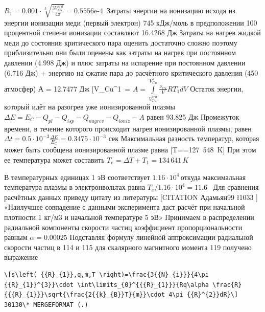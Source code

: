 \documentclass[11pt]{article}
\begin{document}
\({{R}_{1}}=0.001\cdot \sqrt[3]{\frac{3V_{Cu}^{crit}}{4\pi }}=\text{0}\text{.5556e-4}\, \)
Затраты энергии на ионизацию исходя из энергии ионизации меди (первый
электрон) 745 кДж/моль в предположении 100 процентной степени ионизации
составляют 16.4268 Дж Затраты на нагрев жидкой меди до состояния
критического пара оценить достаточно сложно поэтому приблизительно они
были оценены как затраты на нагрев при постоянном давлении (4.998 Дж) и
плюс затраты на испарение при постоянном давлении (6.716 Дж) + энергию
на сжатие пара до расчётного критического давления (450 атмосфер) А =
12.7477 Дж
{[}V\_{Cu}^{1~}=\frac{{{\nu }_{Cu}}R{{T}_{1}}}{{{p}^{1\ }}}{]}
\(A=\int\limits_{V_{Cu}^{crit}}^{V_{Cu}^{1\, }}{\frac{{{\nu }_{Cu}}}{V}R{{T}_{1}}dV}\)
Остаток энергии, который идёт на разогрев уже ионизированной плазмы
\(\Delta E={{E}_{C}}-{{Q}_{pl}}-{{Q}_{isp}}-{{Q}_{nagrev}}-{{Q}_{ioniz}}-A\)
равен 93.825 Дж Промежуток времени, в течение которого происходит нагрев
ионизированной плазмы, равен
\(\Delta t=0.5\cdot {{10}^{-3}}\frac{\Delta E}{{{E}_{C}}}=0.3475\cdot {{10}^{-3}}\)
сек Максимальная разность температур, которая может быть сообщена
ионизированной плазме равна
{[}\Delta T==127~548~K{]}
При этом ее температура может составить
\({{T}_{e}}=\Delta T+{{T}_{1}}=134\, 641\, K\)

В температурных единицах 1 эВ соответствует
\(1.16\cdot {{10}^{4}}\, \)откуда максимальная температура плазмы в
электронвольтах равна \({{{T}_{e}}}/{1.16\cdot {{10}^{4}}=11.6\ }\;\)
Для сравнения расчётных данных приведу цитату из литературы {[}CITATION
Адамьян99 \l 1033 {]} «Наилучшее совпадение с данными эксперимента даст
расчёт при начальной плотности 1 кг/м3 и начальной температуре 5 эВ»
Принимаем в распределении радиальной компоненты скорости частиц
коэффициент пропорциональности равным \(\alpha =0.00025\) Подставляя
формулу линейной аппроксимации радиальной скорости частиц в 114 и 115
для скалярного магнитного момента 119 получено выражение

\begin{verbatim}
\[s\left( {{R}_{1}},q,m,T \right)=\frac{3{{N}_{i}}}{4\pi {{R}_{1}}^{3}}\cdot \int\limits_{0}^{{{R}_{1}}}{Rq\alpha \frac{R}{{{R}_{1}}}\sqrt{\frac{2{{k}_{B}}T}{m}}\cdot 4\pi {{R}^{2}}dR}\]  30130\* MERGEFORMAT (.)
\end{verbatim}
\end{document}
